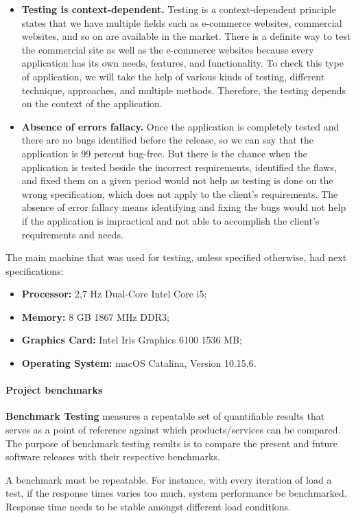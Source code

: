\documentclass[thesis=M,english,hidelinks]{FITthesis}[2019/12/23]
\begin{document}
\begin{itemize}
	\item \textbf{Testing is context-dependent.} Testing is a context-dependent principle states that we have multiple fields such as e-commerce websites, commercial websites, and so on are available in the market. There is a definite way to test the commercial site as well as the e-commerce websites because every application has its own needs, features, and functionality. To check this type of application, we will take the help of various kinds of testing, different technique, approaches, and multiple methods. Therefore, the testing depends on the context of the application.
	\item \textbf{Absence of errors fallacy.} Once the application is completely tested and there are no bugs identified before the release, so we can say that the application is 99 percent bug-free. But there is the chance when the application is tested beside the incorrect requirements, identified the flaws, and fixed them on a given period would not help as testing is done on the wrong specification, which does not apply to the client's requirements. The absence of error fallacy means identifying and fixing the bugs would not help if the application is impractical and not able to accomplish the client's requirements and needs.
\end{itemize}


The main machine that was used for testing, unless specified otherwise, had next specifications:
\begin{itemize}
	\item \textbf{Processor:} 2,7 Hz Dual-Core Intel Core i5;
	\item \textbf{Memory:} 8 GB 1867 MHz DDR3;
	\item \textbf{Graphics Card:} Intel Iris Graphics 6100 1536 MB;
	\item \textbf{Operating System:} macOS Catalina, Version 10.15.6.
\end{itemize}

\paragraph{Project benchmarks}

\textbf{Benchmark Testing} measures a repeatable set of quantifiable results that serves as a point of reference against which products/services can be compared. The purpose of benchmark testing results is to compare the present and future software releases with their respective benchmarks.

A benchmark must be repeatable. For instance, with every iteration of load a test, if the response times varies too much, system performance be benchmarked. Response time needs to be stable amongst different load conditions.
\end{document}
